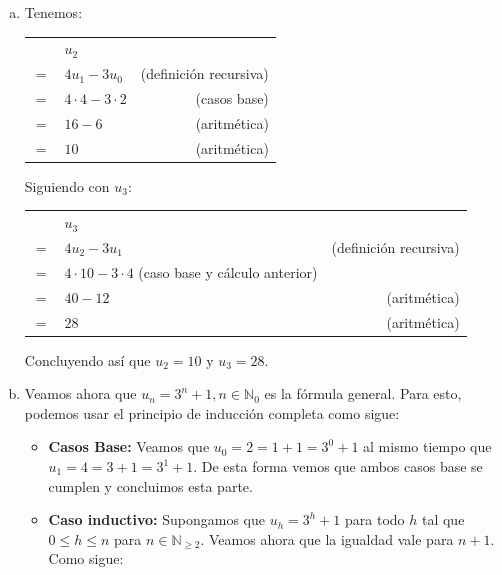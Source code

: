 \begin{enumerate}[(a)]
    \item Tenemos:

          \begin{tabular}{|l l r}
             & $u_2$ & \\
            $=$ & $4 u_1 - 3 u_0$ & (definición recursiva) \\
            $=$ & $4 \cdot 4 - 3 \cdot 2$ & (casos base) \\
            $=$ & $16 - 6$ & (aritmética) \\
            $=$ & $10$ & (aritmética) \\
          \end{tabular}

          Siguiendo con $u_3$:

          \begin{tabular}{|l l r}
             & $u_3$ & \\
            $=$ & $4 u_2 - 3 u_1$ & (definición recursiva) \\
            $=$ & $4 \cdot 10 - 3 \cdot 4$ (caso base y cálculo anterior) \\
            $=$ & $40 - 12$ & (aritmética) \\
            $=$ & $28$ & (aritmética) \\
          \end{tabular}

          Concluyendo así que $u_2 = 10 \text{ y } u_3 = 28$.

    \item Veamos ahora que $u_n = 3^n + 1, n \in \mathbb{N}_0$ es la fórmula general.
          Para esto, podemos usar el principio de inducción completa como sigue:

          \begin{itemize}
            \item \textbf{Casos Base:} Veamos que $u_0 = 2 = 1 + 1 = 3^0 + 1$ al mismo tiempo que $u_1 = 4 = 3 + 1 = 3^1 + 1$.
                  De esta forma vemos que ambos casos base se cumplen y concluimos esta parte.

            \item \textbf{Caso inductivo:} Supongamos que $u_h = 3^h + 1$ para todo $h$ tal que $0 \le h \le n$ para $n \in \mathbb{N}_{\ge 2}$.
                  Veamos ahora que la igualdad vale para $n+1$. Como sigue:


\end{itemize}
\end{enumerate}
